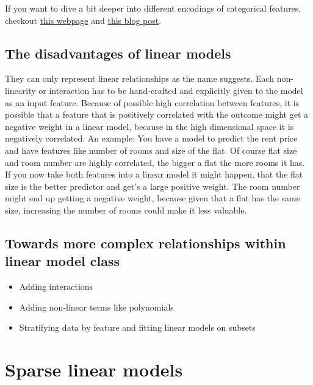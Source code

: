 \documentclass[12pt,]{krantz}
\providecommand{\tightlist}{%
  \setlength{\itemsep}{0pt}\setlength{\parskip}{0pt}}
\theoremstyle{definition}
\theoremstyle{definition}
\theoremstyle{definition}
\theoremstyle{remark}
\begin{document}
If you want to dive a bit deeper into different encodings of categorical
features, checkout
\href{http://stats.idre.ucla.edu/r/library/r-library-contrast-coding-systems-for-categorical-variables/}{this
webpage} and \href{http://heidiseibold.github.io/page7/}{this blog
post}.

\subsection{The disadvantages of linear
models}\label{the-disadvantages-of-linear-models}

They can only represent linear relationships as the name suggests. Each
non-linearity or interaction has to be hand-crafted and explicitly given
to the model as an input feature. Because of possible high correlation
between features, it is possible that a feature that is positively
correlated with the outcome might get a negative weight in a linear
model, because in the high dimensional space it is negatively
correlated. An example: You have a model to predict the rent price and
have features like number of rooms and size of the flat. Of course flat
size and room number are highly correlated, the bigger a flat the more
rooms it has. If you now take both features into a linear model it might
happen, that the flat size is the better predictor and get's a large
positive weight. The room number might end up getting a negative weight,
because given that a flat has the same size, increasing the number of
rooms could make it less valuable.

\subsection{Towards more complex relationships within linear model
class}\label{towards-more-complex-relationships-within-linear-model-class}

\begin{itemize}
\tightlist
\item
  Adding interactions
\item
  Adding non-linear terms like polynomials
\item
  Stratifying data by feature and fitting linear models on subsets
\end{itemize}

\section{Sparse linear models}\label{sparse-linear-models}
\end{document}
